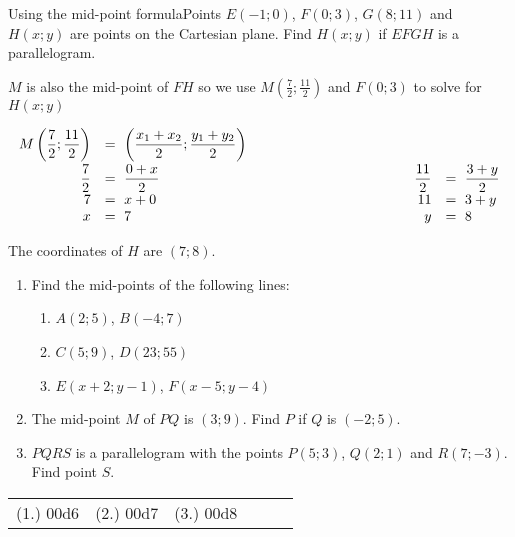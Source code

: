 \begin{wex}{Using the mid-point formula}{Points $E(-1;0)$, $F(0;3)$, $G(8;11)$ and $H(x;y)$ are points on the Cartesian plane. Find $H(x;y)$ if $EFGH$ is a parallelogram.}
{
$M$ is also the mid-point of $FH$ so we use 
$M(\frac{7}{2};\frac{11}{2})$ and $F(0;3)$ to solve for $H(x;y)$

\begin{equation*}
\begin{array}{rllrl}
 M\left(\dfrac{7}{2};\dfrac{11}{2}\right) &=~\left(\dfrac{x_1+x_2}{2}; \dfrac{y_1+y_2}{2}\right)\\[8pt]
\dfrac{7}{2}&=~\dfrac{0+x}{2}&\hskip10em&\dfrac{11}{2}&=~\dfrac{3+y}{2}\\
7&=~x+0&&11&=~3+y\\
x&=~7&&y&=~8\\
\end{array}
\end{equation*}

The coordinates of $H$ are $(7;8)$.
}
\end{wex}
\begin{exercises}{}{
\begin{enumerate}[itemsep=5pt, label=\textbf{\arabic*}. ]
\item Find the mid-points of the following lines:
  \begin{enumerate}[noitemsep, label=\textbf{(\alph*)} ]
\item $A(2;5)$, $B(-4;7)$
\item $C(5;9)$, $D(23;55)$
\item $E(x+2;y-1)$, $F(x-5;y-4)$
  \end{enumerate}
    \item The mid-point $M$ of $PQ$ is $(3;9)$. Find $P$ if $Q$ is $(-2;5)$.
    \item $PQRS$ is a parallelogram with the points $P(5;3)$, $Q(2;1)$ and $R(7;-3)$. Find point $S$.

    \end{enumerate}
\practiceinfo
\par 
\par \begin{tabular}[h]{cccccc}
(1.) 00d6&  (2.) 00d7&  (3.) 00d8\end{tabular}
}
\end{exercises}    

